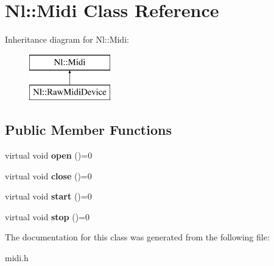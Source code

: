 \hypertarget{classNl_1_1Midi}{\section{Nl\-:\-:Midi Class Reference}
\label{classNl_1_1Midi}
}
Inheritance diagram for Nl\-:\-:Midi\-:\begin{figure}[H]
\begin{center}
\leavevmode
\includegraphics[height=2.000000cm]{classNl_1_1Midi}
\end{center}
\end{figure}
\subsection*{Public Member Functions}
\begin{DoxyCompactItemize}
\item 
\hypertarget{classNl_1_1Midi_add7d5ffb7a2b8cec766ee0aed15064bc}{virtual void {\bfseries open} ()=0}\label{classNl_1_1Midi_add7d5ffb7a2b8cec766ee0aed15064bc}

\item 
\hypertarget{classNl_1_1Midi_a2d831614cdfa8b799bdcf407f29210c9}{virtual void {\bfseries close} ()=0}\label{classNl_1_1Midi_a2d831614cdfa8b799bdcf407f29210c9}

\item 
\hypertarget{classNl_1_1Midi_a51f4fec3d17c920a3f5a500075c97d12}{virtual void {\bfseries start} ()=0}\label{classNl_1_1Midi_a51f4fec3d17c920a3f5a500075c97d12}

\item 
\hypertarget{classNl_1_1Midi_a4beb0e55eb868636f41777740733e5c5}{virtual void {\bfseries stop} ()=0}\label{classNl_1_1Midi_a4beb0e55eb868636f41777740733e5c5}

\end{DoxyCompactItemize}


The documentation for this class was generated from the following file\-:\begin{DoxyCompactItemize}
\item 
midi.\-h\end{DoxyCompactItemize}
